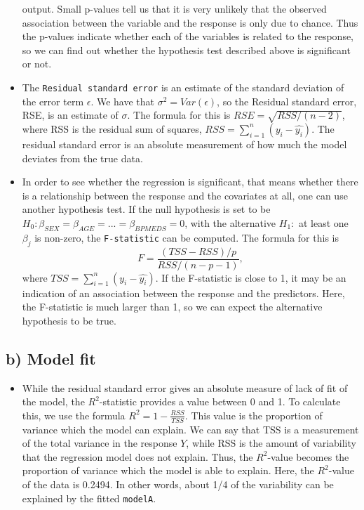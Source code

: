 \documentclass[]{article}
\providecommand{\tightlist}{%
  \setlength{\itemsep}{0pt}\setlength{\parskip}{0pt}}
\begin{document}
\begin{itemize}
  output. Small p-values tell us that it is very unlikely that the
  observed association between the variable and the response is only due
  to chance. Thus the p-values indicate whether each of the variables is
  related to the response, so we can find out whether the hypothesis
  test described above is significant or not.
\item
  The \texttt{Residual\ standard\ error} is an estimate of the standard
  deviation of the error term \(\epsilon\). We have that
  \(\sigma^2=Var(\epsilon)\), so the Residual standard error, RSE, is an
  estimate of \(\sigma\). The formula for this is
  \(RSE = \sqrt{RSS/(n-2)}\), where RSS is the residual sum of squares,
  \(RSS = \sum_{i=1}^{n}(y_i-\hat{y_i})\). The residual standard error
  is an absolute measurement of how much the model deviates from the
  true data.
\item
  In order to see whether the regression is significant, that means
  whether there is a relationship between the response and the
  covariates at all, one can use another hypothesis test. If the null
  hypothesis is set to be
  \(H_0: \beta_{SEX} = \beta_{AGE} = ... = \beta_{BPMEDS} = 0\), with
  the alternative \(H_1:\) at least one \(\beta_j\) is non-zero, the
  \texttt{F-statistic} can be computed. The formula for this is
  \[F = \frac{(TSS-RSS)/p}{RSS/(n-p-1)},\] where
  \(TSS=\sum_{i=1}^{n}(y_i-\hat{y_i})\). If the F-statistic is close to
  1, it may be an indication of an association between the response and
  the predictors. Here, the F-statistic is much larger than 1, so we can
  expect the alternative hypothesis to be true.
\end{itemize}

\subsection{b) Model fit}\label{b-model-fit}

\begin{itemize}
\tightlist
\item
  While the residual standard error gives an absolute measure of lack of
  fit of the model, the \(R^2\)-statistic provides a value between 0 and
  1. To calculate this, we use the formula \(R^2 = 1-\frac{RSS}{TSS}\).
  This value is the proportion of variance which the model can explain.
  We can say that TSS is a measurement of the total variance in the
  response \(Y\), while RSS is the amount of variability that the
  regression model does not explain. Thus, the \(R^2\)-value becomes the
  proportion of variance which the model is able to explain. Here, the
  \(R^2\)-value of the data is 0.2494. In other words, about 1/4 of the
  variability can be explained by the fitted \texttt{modelA}.
\end{itemize}
\end{document}
